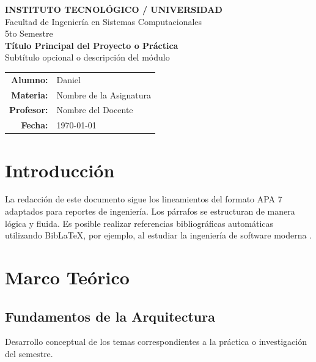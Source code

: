\documentclass[12pt,letterpaper]{article}
\begin{document}
\begin{center}
    {\Large \textbf{INSTITUTO TECNOLÓGICO / UNIVERSIDAD}} \\[0.3cm]
    {\large Facultad de Ingeniería en Sistemas Computacionales} \\[0.2cm]
    {\normalsize 5to Semestre} \\[1.5cm]
    
    {\LARGE \textbf{Título Principal del Proyecto o Práctica}} \\[0.5cm]
    {\large Subtítulo opcional o descripción del módulo} \\[2cm]
    
    \begin{tabular}{rl}
        \textbf{Alumno:} & Daniel \\
        \textbf{Materia:} & Nombre de la Asignatura \\
        \textbf{Profesor:} & Nombre del Docente \\
        \textbf{Fecha:} & \today \\
    \end{tabular}
\end{center}

\thispagestyle{empty}
\newpage

\section{Introducción}
\label{sec:introduccion}

La redacción de este documento sigue los lineamientos del formato APA 7 adaptados para reportes de ingeniería. Los párrafos se estructuran de manera lógica y fluida. Es posible realizar referencias bibliográficas automáticas utilizando BibLaTeX, por ejemplo, al estudiar la ingeniería de software moderna \cite{sommerville2019}.

\section{Marco Teórico}
\label{sec:marco_teorico}

\subsection{Fundamentos de la Arquitectura}
Desarrollo conceptual de los temas correspondientes a la práctica o investigación del semestre.
\end{document}
